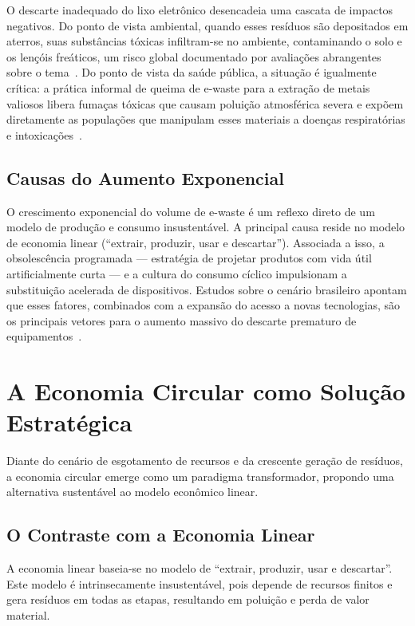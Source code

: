 \documentclass[
	12pt,				%
	openright,			%
	oneside,			%
	a4paper,			%
	english,			%
	brazil				%
	]{abntex2}
\theoremstyle{definition}
\begin{document}
O descarte inadequado do lixo eletrônico desencadeia uma cascata de impactos negativos. Do ponto de vista ambiental, quando esses resíduos são depositados em aterros, suas substâncias tóxicas infiltram-se no ambiente, contaminando o solo e os lençóis freáticos, um risco global documentado por avaliações abrangentes sobre o tema~\cite{Robinson2009}. Do ponto de vista da saúde pública, a situação é igualmente crítica: a prática informal de queima de e-waste para a extração de metais valiosos libera fumaças tóxicas que causam poluição atmosférica severa e expõem diretamente as populações que manipulam esses materiais a doenças respiratórias e intoxicações~\cite{Heacock2016}.

\subsection{Causas do Aumento Exponencial}

O crescimento exponencial do volume de e-waste é um reflexo direto de um modelo de produção e consumo insustentável. A principal causa reside no modelo de economia linear (“extrair, produzir, usar e descartar”). Associada a isso, a obsolescência programada — estratégia de projetar produtos com vida útil artificialmente curta — e a cultura do consumo cíclico impulsionam a substituição acelerada de dispositivos. Estudos sobre o cenário brasileiro apontam que esses fatores, combinados com a expansão do acesso a novas tecnologias, são os principais vetores para o aumento massivo do descarte prematuro de equipamentos~\cite{Pereira2018, Forti2020}.

\section{A Economia Circular como Solução Estratégica}

Diante do cenário de esgotamento de recursos e da crescente geração de resíduos, a economia circular emerge como um paradigma transformador, propondo uma alternativa sustentável ao modelo econômico linear.

\subsection{O Contraste com a Economia Linear}

A economia linear baseia-se no modelo de ``extrair, produzir, usar e descartar''. Este modelo é intrinsecamente insustentável, pois depende de recursos finitos e gera resíduos em todas as etapas, resultando em poluição e perda de valor material.
\end{document}
